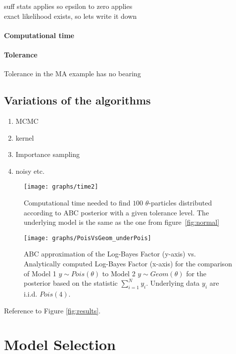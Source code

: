 \documentclass[fleqn,10pt]{SelfArx} %
\begin{document}
suff stats applies so epsilon to zero applies\\
exact likelihood exists, so lets write it down\\
\paragraph{Computational time} \lipsum[7] %
\paragraph{Tolerance} \lipsum[8] %
Tolerance in the MA example has no bearing

\subsection{Variations of the algorithms}
\begin{enumerate}[noitemsep] %
\item MCMC
\item kernel
\item Importance sampling
\item noisy etc.
\end{enumerate}

\begin{figure}[ht]\centering
\texttt{[image: graphs/time2]}
\caption{Computational time needed to find $100$ $\theta$-particles distributed according to ABC posterior with a given tolerance level. The underlying model is the same as the one from figure~\ref{fig:normal}}
\label{fig:time}
\end{figure}

\begin{figure}[ht]\centering
\texttt{[image: graphs/PoisVsGeom\_underPois]}
\caption{ABC approximation of the Log-Bayes Factor (y-axis) vs. Analytically computed Log-Bayes Factor (x-axis) for the comparison of Model 1 $y\sim Pois(\theta)$ to Model 2 $y\sim Geom(\theta)$ for the posterior based on the statistic $\sum_{i=1}^Ny_i$. Underlying data $y_i$ are i.i.d. $Pois(4)$.}
\label{fig:PoisGeom}
\end{figure}


Reference to Figure \ref{fig:results}.


\section{Model Selection}
\end{document}
